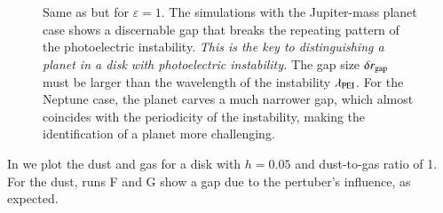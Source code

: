 \documentclass[onecolumn]{report}
\begin{document}
\begin{figure}
  \begin{center}
  \end{center}
  \caption{Same as  but for $\varepsilon=1$. The
    simulations with the Jupiter-mass planet case shows a
    discernable gap that breaks the repeating pattern of the
    photoelectric instability. {\it This is the key to distinguishing
      a planet in a disk with photoelectric instability.} The gap size
    $\delta r_{\rm gap}$ must be larger than the wavelength of the
    instability $\lambda_{\rm PEI}$. For the Neptune case, the planet
    carves a much narrower gap, which almost coincides with the
    periodicity of the instability, making the identification of a
    planet more challenging.}
  \label{fig:eps1dustprofile}
\end{figure}


In  we plot the dust and gas for a disk with $h=0.05$ and dust-to-gas ratio of 1. For the dust, runs F and G show a gap due to the pertuber's influence, as expected.
\end{document}
